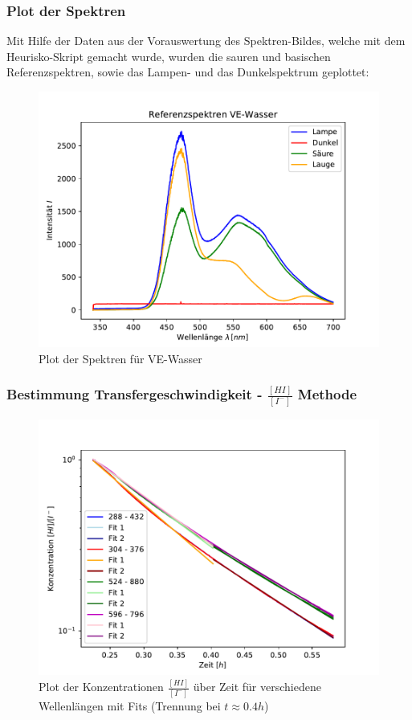\documentclass[12pt]{article}
\begin{document}
\subsubsection{Plot der Spektren}

Mit Hilfe der Daten aus der Vorauswertung des Spektren-Bildes, welche mit dem Heurisko-Skript gemacht wurde, wurden die sauren und basischen Referenzspektren, sowie das Lampen- und das Dunkelspektrum geplottet:

\begin{figure}[H]
	\centering
	\includegraphics[width=120mm]{VE-Wasser/Referenzspektren}
	\caption{Plot der Spektren für VE-Wasser}
\end{figure}

\subsubsection{Bestimmung Transfergeschwindigkeit - $\frac{[HI]}{[I^-]}$ Methode}
\begin{figure}[H]
	\centering
	\includegraphics[width=120mm]{VE-Wasser/TransferhIKnick}
	\caption{Plot der Konzentrationen $\frac{[HI]}{[I^-]}$ über Zeit für verschiedene Wellenlängen mit Fits (Trennung bei $t \approx 0.4h$)}
\end{figure}
\end{document}
